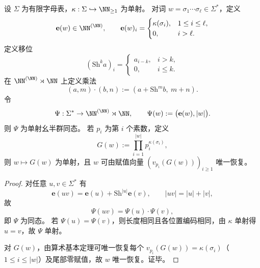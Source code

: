\begin{proposition}[投影词的哥德尔半直积表示]\label{prop:conclusion-projection-word-godel-semidirect}
设 \(\Sigma\) 为有限字母表，\(\kappa:\Sigma\hookrightarrow\NN_{\ge 1}\) 为单射。
对词 \(w=\sigma_1\cdots\sigma_\ell\in\Sigma^\ast\)，定义
\[
\mathbf e(w)\in \NN^{(\NN)},\qquad
\mathbf e(w)_i=
\begin{cases}
\kappa(\sigma_i),&1\le i\le \ell,\\
0,&i>\ell.
\end{cases}
\]
定义移位
\[
(\mathrm{Sh}^k a)_i=
\begin{cases}
a_{i-k},&i>k,\\
0,&i\le k.
\end{cases}
\]
在 \(\NN^{(\NN)}\rtimes\NN\) 上定义乘法
\[
(a,m)\cdot(b,n):=(a+\mathrm{Sh}^m b,\ m+n).
\]
令
\[
\Psi:\Sigma^\ast\to\NN^{(\NN)}\rtimes\NN,\qquad
\Psi(w):=\bigl(\mathbf e(w),|w|\bigr).
\]
则 \(\Psi\) 为单射幺半群同态。
若 \(p_i\) 为第 \(i\) 个素数，定义
\[
G(w):=\prod_{i=1}^{|w|}p_i^{\kappa(\sigma_i)},
\]
则 \(w\mapsto G(w)\) 为单射，且 \(w\) 可由赋值向量 \((v_{p_i}(G(w)))_{i\ge 1}\) 唯一恢复。
\end{proposition}
\begin{proof}
对任意 \(u,v\in\Sigma^\ast\) 有
\[
\mathbf e(uv)=\mathbf e(u)+\mathrm{Sh}^{|u|}\mathbf e(v),\qquad |uv|=|u|+|v|,
\]
故
\[
\Psi(uv)=\Psi(u)\cdot\Psi(v),
\]
即 \(\Psi\) 为同态。
若 \(\Psi(u)=\Psi(v)\)，则长度相同且各位置编码相同，由 \(\kappa\) 单射得 \(u=v\)，故 \(\Psi\) 单射。

对 \(G(w)\)，由算术基本定理可唯一恢复每个 \(v_{p_i}(G(w))=\kappa(\sigma_i)\)（\(1\le i\le |w|\)）及尾部零赋值，故 \(w\) 唯一恢复。证毕。
\end{proof}








